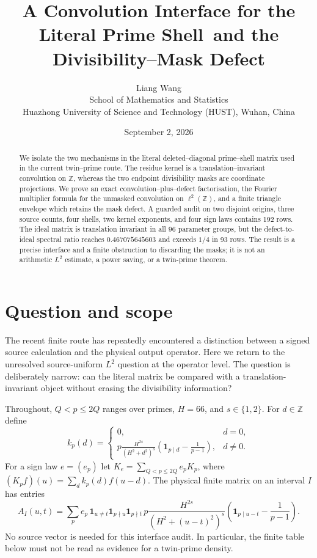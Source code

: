 \documentclass[10pt]{article}
\title{A Convolution Interface for the Literal Prime Shell\
and the Divisibility--Mask Defect}
\author{Liang Wang\\
School of Mathematics and Statistics\\
Huazhong University of Science and Technology (HUST), Wuhan, China}
\date{September 2, 2026}
\newcommand{\Z}{\mathbb Z}
\newcommand{\el}{\ell^2}
\begin{document}
\maketitle

\begin{abstract}
We isolate the two mechanisms in the literal deleted--diagonal prime--shell
matrix used in the current twin--prime route.  The residue kernel is a
translation--invariant convolution on $\mathbb Z$, whereas the two endpoint
divisibility masks are coordinate projections.  We prove an exact
convolution--plus--defect factorisation, the Fourier multiplier formula for
the unmasked convolution on $\el(\mathbb Z)$, and a finite triangle envelope
which retains the mask defect.  A guarded audit on two disjoint origins,
three source counts, four shells, two kernel exponents, and four sign laws
contains 192 rows.  The ideal matrix is translation invariant in all 96
parameter groups, but the defect-to-ideal spectral ratio reaches
$0.467075645603$ and exceeds $1/4$ in 93 rows.  The result is a precise
interface and a finite obstruction to discarding the masks; it is not an
arithmetic $L^2$ estimate, a power saving, or a twin-prime theorem.
\end{abstract}

\section{Question and scope}

The recent finite route has repeatedly encountered a distinction between a
signed source calculation and the physical output operator.  Here we return
to the unresolved source-uniform $L^2$ question at the operator level.  The
question is deliberately narrow: can the literal matrix be compared with a
translation-invariant object without erasing the divisibility information?

Throughout, $Q<p\leq 2Q$ ranges over primes, $H=66$, and $s\in\{1,2\}$.
For $d\in\Z$ define
\begin{equation}
 k_p(d)=\begin{cases}
 0,&d=0,\\[2mm]
 \displaystyle p\frac{H^{2s}}{(H^2+d^2)^s}
 \left(\mathbf 1_{p\mid d}-\frac1{p-1}\right),&d\ne0.
 \end{cases} \label{eq:kernel}
\end{equation}
For a sign law $e=(e_p)$ let $K_e=\sum_{Q<p\leq2Q}e_pK_p$, where
$(K_pf)(u)=\sum_d k_p(d)f(u-d)$.  The physical finite matrix on an interval
$I$ has entries
\begin{equation}
 A_I(u,t)=\sum_p e_p\,\mathbf 1_{u\ne t}\mathbf 1_{p\nmid u}
 \mathbf 1_{p\nmid t}\,p\frac{H^{2s}}{(H^2+(u-t)^2)^s}
 \left(\mathbf 1_{p\mid u-t}-\frac1{p-1}\right). \label{eq:physical}
\end{equation}
No source vector is needed for this interface audit.  In particular, the
finite table below must not be read as evidence for a twin-prime density.
\end{document}
